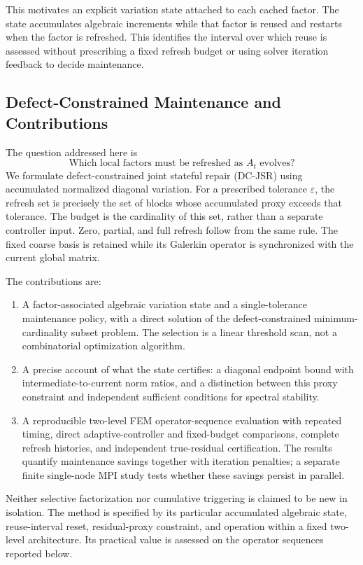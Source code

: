 \documentclass[preprint,12pt,3p]{elsarticle}
\begin{document}
This motivates an explicit variation state attached to each cached factor.
The state accumulates algebraic increments while that factor is reused and
restarts when the factor is refreshed. This identifies the interval over which
reuse is assessed without prescribing a fixed refresh budget or using solver
iteration feedback to decide maintenance.

\subsection{Defect-Constrained Maintenance and Contributions}
The question addressed here is
\begin{equation}
\text{Which local factors must be refreshed as } A_t\text{ evolves?}
\label{eq:central_research_question}
\end{equation}
We formulate defect-constrained joint stateful repair (DC-JSR) using accumulated
normalized diagonal variation. For a prescribed tolerance $\varepsilon$, the
refresh set is precisely the set of blocks whose accumulated proxy exceeds
that tolerance. The budget is the cardinality of this set, rather than a
separate controller input. Zero, partial, and full refresh follow from the
same rule. The fixed coarse basis is retained while its Galerkin operator is
synchronized with the current global matrix.

The contributions are:
\begin{enumerate}
\item A factor-associated algebraic variation state and a single-tolerance
maintenance policy, with a direct solution of the defect-constrained
minimum-cardinality subset problem. The selection is a linear threshold scan,
not a combinatorial optimization algorithm.
\item A precise account of what the state certifies: a diagonal endpoint bound
with intermediate-to-current norm ratios, and a distinction between this
proxy constraint and independent sufficient conditions for spectral stability.
\item A reproducible two-level FEM operator-sequence evaluation with repeated
timing, direct adaptive-controller and fixed-budget comparisons, complete
refresh histories, and independent true-residual certification. The results
quantify maintenance savings together with iteration penalties; a separate
finite single-node MPI study tests whether these savings persist in parallel.
\end{enumerate}
Neither selective factorization nor cumulative triggering is claimed to be
new in isolation. The method is specified by its particular accumulated
algebraic state, reuse-interval reset, residual-proxy constraint, and operation
within a fixed two-level architecture. Its practical value is assessed on
the operator sequences reported below.
\end{document}
